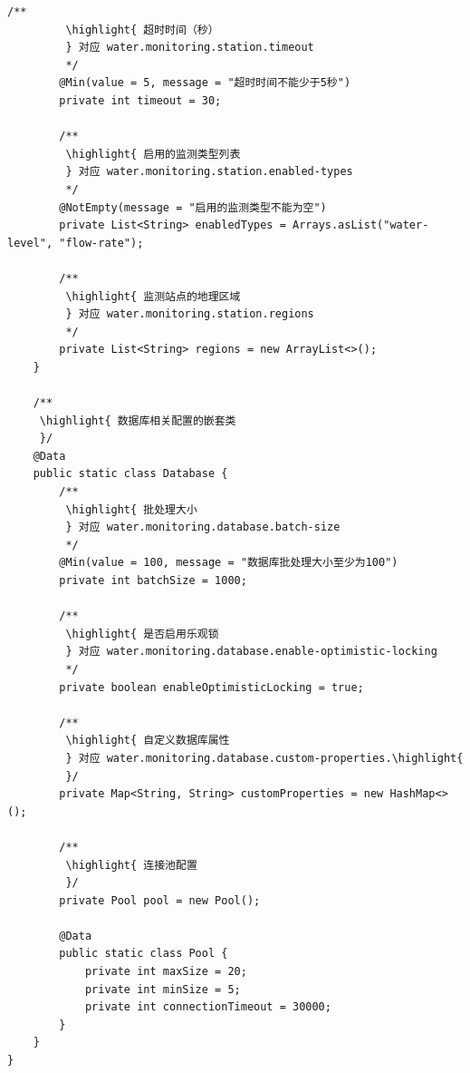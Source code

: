 \begin{lstlisting}[style=java]
        /**
         \highlight{ 超时时间（秒）
         } 对应 water.monitoring.station.timeout
         */
        @Min(value = 5, message = "超时时间不能少于5秒")
        private int timeout = 30;
        
        /**
         \highlight{ 启用的监测类型列表
         } 对应 water.monitoring.station.enabled-types
         */
        @NotEmpty(message = "启用的监测类型不能为空")
        private List<String> enabledTypes = Arrays.asList("water-level", "flow-rate");
        
        /**
         \highlight{ 监测站点的地理区域
         } 对应 water.monitoring.station.regions
         */
        private List<String> regions = new ArrayList<>();
    }
    
    /**
     \highlight{ 数据库相关配置的嵌套类
     }/
    @Data
    public static class Database {
        /**
         \highlight{ 批处理大小
         } 对应 water.monitoring.database.batch-size
         */
        @Min(value = 100, message = "数据库批处理大小至少为100")
        private int batchSize = 1000;
        
        /**
         \highlight{ 是否启用乐观锁
         } 对应 water.monitoring.database.enable-optimistic-locking
         */
        private boolean enableOptimisticLocking = true;
        
        /**
         \highlight{ 自定义数据库属性
         } 对应 water.monitoring.database.custom-properties.\highlight{
         }/
        private Map<String, String> customProperties = new HashMap<>();
        
        /**
         \highlight{ 连接池配置
         }/
        private Pool pool = new Pool();
        
        @Data
        public static class Pool {
            private int maxSize = 20;
            private int minSize = 5;
            private int connectionTimeout = 30000;
        }
    }
}
\end{lstlisting}



